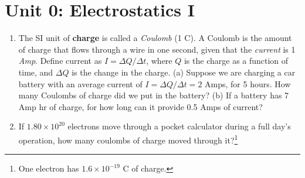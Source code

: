 \documentclass{article}
\begin{document}
\section{Unit 0: Electrostatics I}
\begin{enumerate}
\item The SI unit of \textbf{charge} is called a \textit{Coulomb} (1 C).  A Coulomb is the amount of charge that flows through a wire in one second, given that the \textit{current} is 1 \textit{Amp}. Define current as $I = \Delta Q/\Delta t$, where $Q$ is the charge as a function of time, and $\Delta Q$ is the change in the charge.  (a)  Suppose we are charging a car battery with an average current of $I = \Delta Q/\Delta t = 2$ Amps, for 5 hours.  How many Coulombs of charge did we put in the battery? (b) If a battery has 7 Amp hr of charge, for how long can it provide 0.5 Amps of current? \\ \vspace{4cm}
\item If $1.80 \times 10^{20}$ electrons move through a pocket calculator during a full day's operation, how many coulombs of charge moved through it?\footnote{One electron has $1.6 \times 10^{-19}$ C of charge.}
\end{enumerate}
\end{document}
